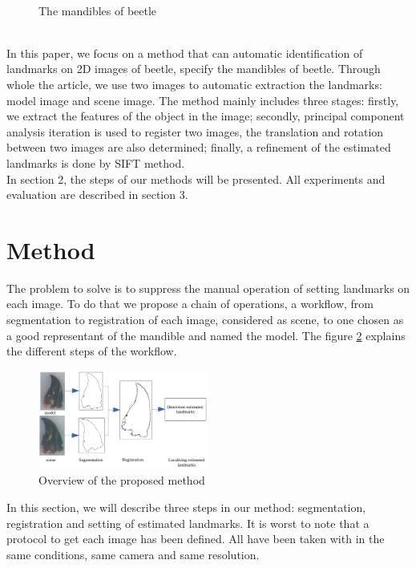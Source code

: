 \documentclass[twoside,twocolumn,10pt]{article}
\begin{document}
\begin{figure}[h]
\centering
{}~~
\caption{The mandibles of beetle}
\label{figparts}
\end{figure}~\\[0.1cm]
In this paper, we focus on a method that can automatic identification
of landmarks on 2D images of beetle, specify the mandibles of
beetle. Through whole the article, we use two images to automatic
extraction the landmarks: model image and scene image. The method
mainly includes three stages: firstly, we extract the features of the
object in the image; secondly, principal component analysis iteration is 
used to register two images, the translation and
rotation between two images are also determined; finally, a refinement of
the estimated landmarks is done by SIFT method.\\[0.1cm]

In section 2, the steps of our methods will be presented. All
experiments and evaluation are described in section 3. 

\section{Method}
The problem to solve is to suppress the manual operation of setting
landmarks on each image. To do that we propose a chain of operations,
a workflow, from segmentation to registration of each image,
considered as scene, to one chosen as a good representant of the
mandible and named the model. The figure \ref{fig:method} explains the
different steps of the workflow. 
\begin{figure}[htb]
    \centering
    \includegraphics[width=0.5\textwidth]{./images/method}
    \caption{Overview of the proposed method}
    \label{fig:method}
\end{figure}
In this section, we will describe three steps in our method:
segmentation, registration and  setting of  estimated
landmarks. It is worst to note that a protocol to get each image has
been defined. All have been taken with in the same conditions, same
camera and same resolution.
\end{document}
